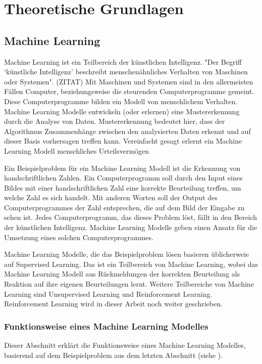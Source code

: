 \chapter{Theoretische Grundlagen}
\section{Machine Learning}
\label{chap:t_ml}
Machine Learning ist ein Teilbereich der künstlichen Intelligenz. "Der Begriff
`künstliche Intelligenz' beschreibt menschenähnliches Verhalten von Maschinen
oder Systemen". (ZITAT) Mit Maschinen und Systemen sind in den allermeisten Fällen       %
Computer, beziehungsweise die steurenden Computerprogramme gemeint. Diese
Computerprogramme bilden ein Modell von menschlichem Verhalten. Machine Learning
Modelle entwickeln (oder erlernen) eine Mustererkennung durch die Analyse von
Daten. Mustererkennung bedeutet hier, dass der Algorithmus Zusammenhänge
zwischen den analysierten Daten erkennt und auf dieser Basis vorhersagen treffen
kann. Vereinfacht gesagt erlernt ein Machine Learning Modell menschliches Urteilsvermögen

Ein Beispielproblem für ein Machine Learning Modell ist die Erkennung von
handschriftlichen Zahlen. Ein Computerprogramm soll durch den Input eines
Bildes mit einer handschriftlichen Zahl eine korrekte Beurteilung treffen, um welche
Zahl es sich handelt. Mit anderen Worten soll der Output des Computerprogrammes
der Zahl entsprechen, die auf dem Bild der Eingabe zu sehen ist. Jedes
Computerprogramm, das dieses Problem löst, fällt in den Bereich der künstlichen
Intelligenz. Machine Learning Modelle geben einen Ansatz für die Umsetzung eines
solchen Computerprogrammes.

Machine Learning Modelle, die das Beispielproblem lösen basieren üblicherweie
auf Supervised Learning. Das ist ein Teilbereich von Machine Learning, wobei das
Machine Learning Modell aus Rückmeldungen der korrekten Beurteilung als Reaktion
auf ihre eigenen Beurteilungen lernt. Weitere Teilbereiche von Machine Learning
sind Unsupervised Learning und Reinforcement Learning. Reinforcement Learning
wird in dieser Arbeit noch weiter geschrieben.

\subsection*{Funktionsweise eines Machine Learning Modelles}
\label{sub:funktionsweise}
Dieser Abschnitt erklärt die Funktionsweise eines Machine Learning Modelles,
basierend auf dem Beispielproblem aus dem letzten Abschnitt (siehe
). 

